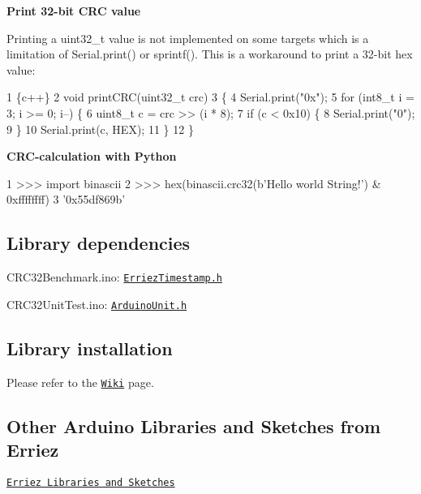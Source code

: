 {\bfseries Print 32-\/bit C\+RC value}

Printing a {\ttfamily uint32\+\_\+t} value is not implemented on some targets which is a limitation of {\ttfamily Serial.\+print()} or {\ttfamily sprintf()}. This is a workaround to print a 32-\/bit hex value\+:


\begin{DoxyCode}
1 \{c++\}
2 void printCRC(uint32\_t crc)
3 \{
4     Serial.print("0x");
5     for (int8\_t i = 3; i >= 0; i--) \{
6         uint8\_t c = crc >> (i * 8);
7         if (c < 0x10) \{
8             Serial.print("0");
9         \}
10         Serial.print(c, HEX);
11     \}
12 \}
\end{DoxyCode}


{\bfseries C\+R\+C-\/calculation with Python}


\begin{DoxyCode}
1 >>> import binascii
2 >>> hex(binascii.crc32(b'Hello world String!') & 0xffffffff)
3 '0x55df869b'
\end{DoxyCode}


\subsection*{Library dependencies}


\begin{DoxyItemize}
\item C\+R\+C32\+Benchmark.\+ino\+: \href{https://github.com/Erriez/ErriezTimestamp.git}{\tt Erriez\+Timestamp.\+h}
\item C\+R\+C32\+Unit\+Test.\+ino\+: \href{https://github.com/mmurdoch/arduinounit}{\tt Arduino\+Unit.\+h}
\end{DoxyItemize}

\subsection*{Library installation}

Please refer to the \href{https://github.com/Erriez/ErriezArduinoLibrariesAndSketches/wiki}{\tt Wiki} page.

\subsection*{Other Arduino Libraries and Sketches from Erriez}


\begin{DoxyItemize}
\item \href{https://github.com/Erriez/ErriezArduinoLibrariesAndSketches}{\tt Erriez Libraries and Sketches} 
\end{DoxyItemize}